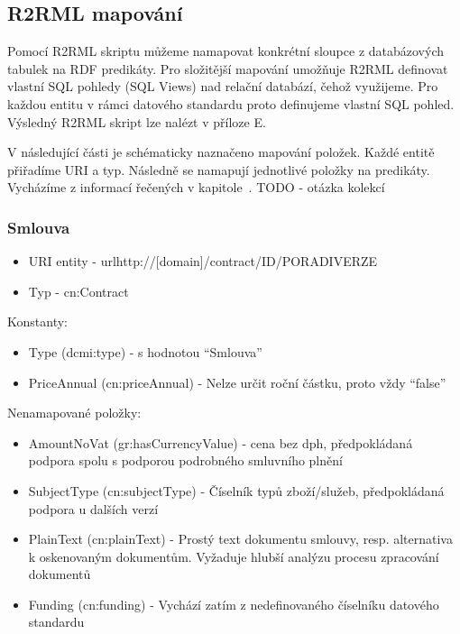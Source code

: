 \subsection{R2RML mapování}

Pomocí R2RML skriptu můžeme namapovat konkrétní sloupce z databázových tabulek na RDF predikáty. Pro složitější mapování umožňuje R2RML definovat vlastní SQL pohledy (SQL Views) nad relační databází, čehož využijeme. Pro každou entitu v rámci datového standardu proto definujeme vlastní SQL pohled. Výsledný R2RML skript lze nalézt v příloze E.

V následující části je schématicky naznačeno mapování položek. Každé entitě přiřadíme URI a typ. Následně se namapují jednotlivé položky na predikáty. Vycházíme z informací řečených v kapitole~. TODO - otázka kolekcí

\subsubsection*{Smlouva}

\begin{itemize}
\item URI entity - url{http://[domain]/contract/{ID}/{PORADIVERZE}}
\item Typ - cn:Contract
\end{itemize}

Konstanty:
\begin{itemize}
\item Type (dcmi:type) - s hodnotou “Smlouva”
\item PriceAnnual (cn:priceAnnual) - Nelze určit roční částku, proto vždy “false”
\end{itemize}

Nenamapované položky:
\begin{itemize}
\item AmountNoVat (gr:hasCurrencyValue) - cena bez dph, předpokládaná podpora spolu s podporou podrobného smluvního plnění
\item SubjectType (cn:subjectType) - Číselník typů zboží/služeb, předpokládaná podpora u dalších verzí
\item PlainText (cn:plainText) - Prostý text dokumentu smlouvy, resp. alternativa k oskenovaným dokumentům. Vyžaduje hlubší analýzu procesu zpracování dokumentů 
\item Funding (cn:funding) - Vychází zatím z nedefinovaného číselníku datového standardu
\end{itemize}

